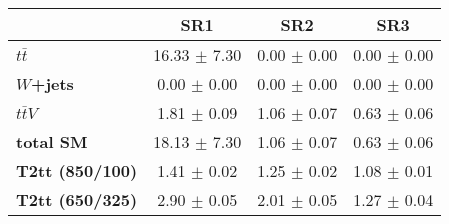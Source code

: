 \begin{tabular}{|l|ccc|}
\hline
&
\textbf{SR1}     &
\textbf{SR2}     &
\textbf{SR3}     \\
\hline
\textbf{$t\bar{t}$}      & 16.33 $\pm$ 7.30    & 0.00 $\pm$ 0.00    & 0.00 $\pm$ 0.00      \\
\textbf{$W$+jets}        & 0.00 $\pm$ 0.00     & 0.00 $\pm$ 0.00    & 0.00 $\pm$ 0.00      \\
\textbf{$t\bar{t}V$}     & 1.81 $\pm$ 0.09     & 1.06 $\pm$ 0.07    & 0.63 $\pm$ 0.06      \\
\hline
\textbf{total SM}        & 18.13 $\pm$ 7.30    & 1.06 $\pm$ 0.07    & 0.63 $\pm$ 0.06      \\
\hline 
\textbf{T2tt (850/100)}  & 1.41 $\pm$ 0.02     & 1.25 $\pm$ 0.02    & 1.08 $\pm$ 0.01      \\
\textbf{T2tt (650/325)}  & 2.90 $\pm$ 0.05     & 2.01 $\pm$ 0.05    & 1.27 $\pm$ 0.04      \\
\hline
\end{tabular}
